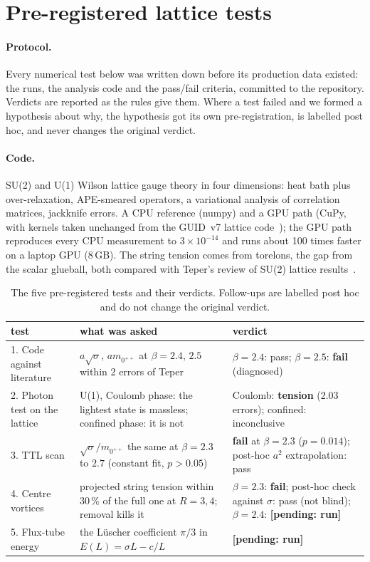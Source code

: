\documentclass[11pt,a4paper]{article}
\newcommand{\pending}[1]{\textbf{[pending: #1]}}
\begin{document}
\section{Pre-registered lattice tests}\label{sec:lattice}

\paragraph{Protocol.} Every numerical test below was written down before its production data existed: the runs, the analysis code and
the pass/fail criteria, committed to the repository. Verdicts are reported as the rules give them. Where a test failed and we formed a
hypothesis about why, the hypothesis got its own pre-registration, is labelled post hoc, and never changes the original verdict.

\paragraph{Code.} SU(2) and U(1) Wilson lattice gauge theory in four dimensions: heat bath plus over-relaxation, APE-smeared operators, a
variational analysis of correlation matrices, jackknife errors. A CPU reference (numpy) and a GPU path (CuPy, with kernels taken unchanged
from the GUID~v7 lattice code~\cite{guidv7}); the GPU path reproduces every CPU measurement to $3\times10^{-14}$ and runs about 100 times
faster on a laptop GPU (8\,GB). The string tension comes from torelons, the gap from the scalar glueball, both compared with Teper's review
of SU(2) lattice results~\cite{teper}.

\begin{table}[h]\centering\small
\caption{The five pre-registered tests and their verdicts. Follow-ups are labelled post hoc and do not change the original verdict.}\label{tab:tests}
\begin{tabularx}{\linewidth}{@{}p{3.1cm}Lp{2.6cm}@{}}\toprule
test & what was asked & verdict \\ . Code against literature & $a\sqrt\sigma$, $am_{0^{++}}$ at $\beta=2.4$, $2.5$ within 2 errors of Teper & $\beta=2.4$: pass; $\beta=2.5$: \textbf{fail} (diagnosed) \\
2. Photon test on the lattice & U(1), Coulomb phase: the lightest state is massless; confined phase: it is not & Coulomb: \textbf{tension} (2.03 errors); confined: inconclusive \\
3. TTL scan & $\sqrt\sigma/m_{0^{++}}$ the same at $\beta=2.3$ to $2.7$ (constant fit, $p>0.05$) & \textbf{fail} at $\beta=2.3$ ($p=0.014$); post-hoc $a^2$ extrapolation: pass \\
4. Centre vortices & projected string tension within 30\,\% of the full one at $R=3,4$; removal kills it & $\beta=2.3$: \textbf{fail}; post-hoc check against $\sigma$: pass (not blind); $\beta=2.4$: \pending{run} \\
5. Flux-tube energy & the L\"uscher coefficient $\pi/3$ in $E(L)=\sigma L-c/L$ & \pending{run} \\
\bottomrule
\end{tabularx}
\end{table}
\end{document}
